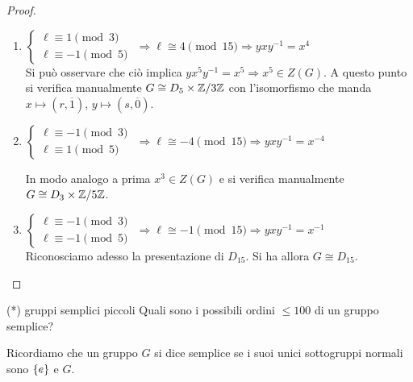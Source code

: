 \begin{proof}
\begin{enumerate}
        Quindi il gruppo è abeliano, ovvero $G \cong \grp{x} \times \grp{y} \cong \Z/2\Z \times \Z/15\Z \cong \Z/30\Z$.
        
        \item
        $\begin{cases}
        \ell \equiv  1 \pmod{3} \\
        \ell \equiv  -1 \pmod{5} 
        \end{cases}$  $\Rightarrow \ell \cong 4 \pmod{15} \Rightarrow yxy^{-1} = x^4$ \\
        Si può osservare che ciò implica $yx^5y^{-1} = x^5  \Rightarrow x^5 \in Z(G)$. 
        A questo punto si verifica manualmente $G \cong D_5 \times \mathbb{Z}/3\mathbb{Z}$ con l'isomorfismo che manda $x \mapsto (r,\overline{1})$, $y \mapsto (s,\overline{0})$.
        
        \item
        $\begin{cases}
        \ell \equiv  -1 \pmod{3} \\
        \ell \equiv  1 \pmod{5} 
        \end{cases}$  $\Rightarrow \ell \cong -4 \pmod{15} \Rightarrow yxy^{-1} = x^{-4}$
        
        In modo analogo a prima $x^3 \in Z(G)$ e si verifica manualmente $G \cong D_3 \times \mathbb{Z}/5\mathbb{Z}$.
        
        \item
        $\begin{cases}
        \ell \equiv  -1 \pmod{3} \\
        \ell \equiv  -1 \pmod{5} 
        \end{cases}$ $\Rightarrow \ell \cong -1 \pmod{15} \Rightarrow yxy^{-1} = x^{-1}$ \\ Riconosciamo adesso la presentazione di $D_{15}$. Si ha allora $G \cong D_{15}$. 
    \end{enumerate}
\end{proof}
\begin{example2}{(*) gruppi semplici piccoli}
    Quali sono i possibili ordini $\leq 100$ di un gruppo semplice?

    Ricordiamo che un gruppo $G$ si dice semplice se i suoi unici sottogruppi normali sono $\left\{ e \right\}$ e $G$. 
\end{example2}
